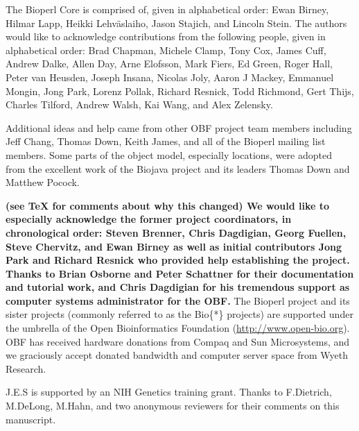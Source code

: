 \documentclass[12pt]{article}
\begin{document}
The Bioperl Core is comprised of, given in alphabetical order: Ewan
Birney, Hilmar Lapp, Heikki Lehv\"{a}slaiho, Jason Stajich, and
Lincoln Stein.  The authors would like to acknowledge contributions
from the following people, given in alphabetical order: Brad Chapman,
Michele Clamp, Tony Cox, James Cuff, Andrew Dalke, Allen Day, Arne
Elofsson, Mark Fiers, Ed Green, Roger Hall, Peter van Heusden, Joseph
Insana, Nicolas Joly, Aaron J Mackey, Emmanuel Mongin, Jong Park,
Lorenz Pollak, Richard Resnick, Todd Richmond, Gert Thijs, Charles
Tilford, Andrew Walsh, Kai Wang, and Alex Zelensky.

Additional ideas and help came from other OBF project team members
including Jeff Chang, Thomas Down, Keith James, and all of the Bioperl
mailing list members.  Some parts of the object model, especially
locations, were adopted from the excellent work of the Biojava project
and its leaders Thomas Down and Matthew Pocock.


% 
\textbf{(see TeX for comments about why this changed)
We would like to especially acknowledge the former project
coordinators, in chronological order: Steven Brenner, Chris Dagdigian,
Georg Fuellen, Steve Chervitz, and Ewan Birney as well as initial
contributors Jong Park and Richard Resnick who provided help
establishing the project.  Thanks to Brian Osborne and Peter Schattner
for their documentation and tutorial work, and Chris Dagdigian for his
tremendous support as computer systems administrator for the OBF.
}
The Bioperl project and its sister projects (commonly referred to as
the Bio\{*\} projects) are supported under the umbrella of the Open
Bioinformatics Foundation (\url{http://www.open-bio.org}).  OBF has
received hardware donations from Compaq and Sun Microsystems, and we
graciously accept donated bandwidth and computer server space from
Wyeth Research.

J.E.S is supported by an NIH Genetics training grant.  Thanks to
F.Dietrich, M.DeLong, M.Hahn, and two anonymous reviewers for their
comments on this manuscript.
\end{document}
